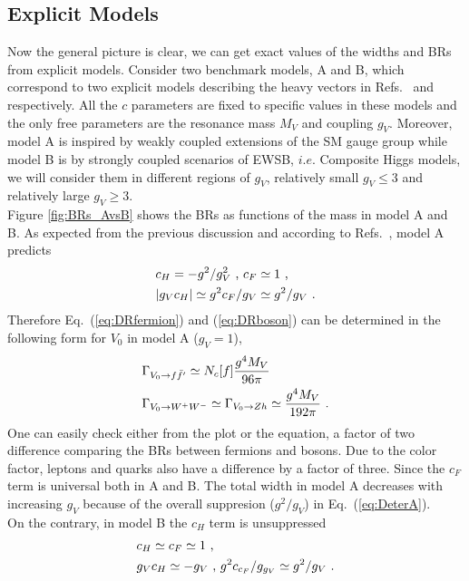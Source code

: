 \subsection{Explicit Models}
Now the general picture is clear, we can get exact values of the widths and BRs from explicit models. Consider two benchmark models, A and B, which correspond to two explicit models describing the heavy vectors in Refs.~\cite{modelA} and \cite{compositehiggs-1} respectively. All the $c$ parameters are fixed to specific values in these models and the only free parameters are the resonance mass $M_{V}$ and coupling $g_{V}$. Moreover, model A is inspired by weakly coupled extensions of the SM gauge group while model B is by strongly coupled scenarios of EWSB, $i.e.$ Composite Higgs models, we will consider them in different regions of $g_{V}$, relatively small $g_{V}\leq3$ and relatively large $g_{V}\geq3$.\\
\newline Figure \ref{fig:BRs_AvsB} shows the BRs as functions of the mass in model A and B. As expected from the previous discussion and according to Refs.~\cite{modelA}, model A predicts
\begin{align}
  \label{eq:DeterA}
  &c_{H}=-g^{2}/g_{V}^{2}\textup{ , }c_{F}\simeq 1 \textup{ ,} \nonumber\\
  &|g_{V}c_{H}|\simeq g^{2}c_{F}/g_{V}\simeq g^{2}/g_{V}\textup{ .}
\end{align}
Therefore Eq.~(\ref{eq:DRfermion}) and (\ref{eq:DRboson}) can be determined in the following form for $V_{0}$ in model A ($g_{V}=1$),
\begin{align}
  &\Gamma_{V_{0}\rightarrow f\bar{f}'}\simeq N_{c}[f]\frac{g^{4}M_{V}}{96\pi}\nonumber\\
  &\Gamma_{V_{0}\rightarrow W^{+}W^{-}}\simeq \Gamma_{V_{0}\rightarrow Zh}\simeq \frac{g^{4}M_{V}}{192\pi}\textup{ .}
\end{align}
One can easily check either from the plot or the equation, a factor of two difference comparing the BRs between fermions and bosons. Due to the color factor, leptons and quarks also have a difference by a factor of three. Since the $c_{F}$ term is universal both in A and B. The total width in model A decreases with increasing $g_{V}$ because of the overall suppresion ($g^{2}/g_{V}$) in Eq.~(\ref{eq:DeterA}).\\ On the contrary, in model B the $c_{H}$ term is unsuppressed
\begin{align}
  \label{eq:DeterB}
  &c_{H}\simeq c_{F}\simeq 1 \textup{ ,}\nonumber\\
  &g_{V}c_{H}\simeq-g_{V}\textup{ , }g^{2}c_{c_{F}}/g_{g_{V}}\simeq g^{2}/g_{V}\textup{ .}
\end{align}

